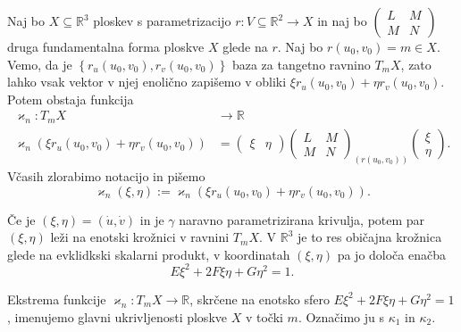 \begin{definicija}
\label{def_razsiritev_normalne_ukrivljenosti}
    Naj bo $X \subseteq \mathbb{R}^3$ ploskev s parametrizacijo $r: V \subseteq \mathbb{R}^2 \to  X$
    in naj bo $\begin{pmatrix}
    L & M \\
    M & N
    \end{pmatrix}$ druga fundamentalna forma ploskve $X$ glede na $r$. Naj bo $r(u_0, v_0) = m \in  X$. Vemo, da je $\left\{ r_u(u_0, v_0), r_v(u_0, v_0) \right\}$ baza za
    tangetno ravnino $T_mX$, zato lahko vsak vektor v njej enolično zapišemo v obliki $\xi r_u(u_0, v_0) + \eta r_v(u_0, v_0).$
    Potem obstaja funkcija \begin{align*}
       \varkappa_n : T_mX &\longrightarrow \mathbb{R} \\
        \varkappa_n(\xi r_u(u_0, v_0) + \eta r_v(u_0, v_0)) &=
        \begin{pmatrix}
          \xi  & \eta
        \end{pmatrix}
        \begin{pmatrix}
          L & M \\
          M & N
        \end{pmatrix}_{(r(u_0, v_0))}  
        \begin{pmatrix}
          \xi \\
          \eta
        \end{pmatrix}.
    \end{align*} 
Včasih zlorabimo notacijo in pišemo \begin{equation*}
  \varkappa_n(\xi, \eta) := \varkappa_n(\xi r_u(u_0, v_0) + \eta r_v(u_0, v_0)).
\end{equation*}  
\end{definicija}

\begin{opomba}
 Če je $(\xi, \eta) = (\dot{u}, \dot{v})$ in je $\gamma$ naravno parametrizirana krivulja, potem par $(\xi, \eta)$ leži
 na enotski krožnici v ravnini $T_mX$. V $\mathbb{R}^3$ je to res običajna krožnica glede na
 evklidkski skalarni produkt, v koordinatah $(\xi, \eta)$ pa jo določa enačba 
 \begin{equation*} E \xi^2 + 2F \xi \eta + G \eta^2  = 1.\end{equation*}
\end{opomba}

\begin{definicija}
\label{def_glavni_ukrivljenosti_ploskve}
 Ekstrema funkcije $\varkappa_n: T_mX \to  \mathbb{R}$, skrčene na enotsko sfero $E \xi^2 + 2F \xi \eta + G \eta^2  = 1$, imenujemo glavni ukrivljenosti ploskve $X$ v točki $m$. 
 Označimo ju s $\kappa_1$ in $\kappa_2$. 
\end{definicija}

